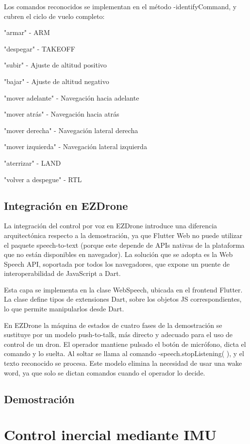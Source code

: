 Los comandos reconocidos se implementan en el método -identifyCommand, y cubren el ciclo de vuelo completo:

"armar"             -	ARM

"despegar"       	-	TAKEOFF

"subir"		        -	Ajuste de altitud positivo

"bajar" 	        -	Ajuste de altitud negativo

"mover adelante" 	-	Navegación hacia adelante

"mover atrás"  	    -	Navegación hacia atrás

"mover derecha" 	-	Navegación lateral derecha

"mover izquierda"	-   Navegación lateral izquierda

"aterrizar"  	    -   LAND

"volver a despegue" -   RTL

\subsection{Integración en EZDrone}
La integración del control por voz en EZDrone introduce una diferencia arquitectónica respecto a la demostración, ya que Flutter Web no puede utilizar el paquete speech-to-text (porque este depende de APIs nativas de la plataforma que no están disponibles en navegador). La solución que se adopta es la Web Speech API, soportada por todos los navegadores, que expone un puente  de interoperabilidad de JavaScript a Dart.

Esta capa se implementa en la clase WebSpeech, ubicada en el frontend Flutter. La clase define tipos de extensiones Dart, sobre los objetos JS correspondientes, lo que permite manipularlos desde Dart. 

En EZDrone la máquina de estados de cuatro fases de la demostración se sustituye por un modelo push-to-talk, más directo y adecuado para el uso de control de un dron. El operador mantiene pulsado el botón de micrófono, dicta el comando y lo suelta. Al soltar se llama al comando -speech.stopListening( ), y el texto reconocido se procesa. Este modelo elimina la necesidad de usar una wake word, ya que solo se dictan comandos cuando el operador lo decide.
\subsection{Demostración}

\section{Control inercial mediante IMU}


